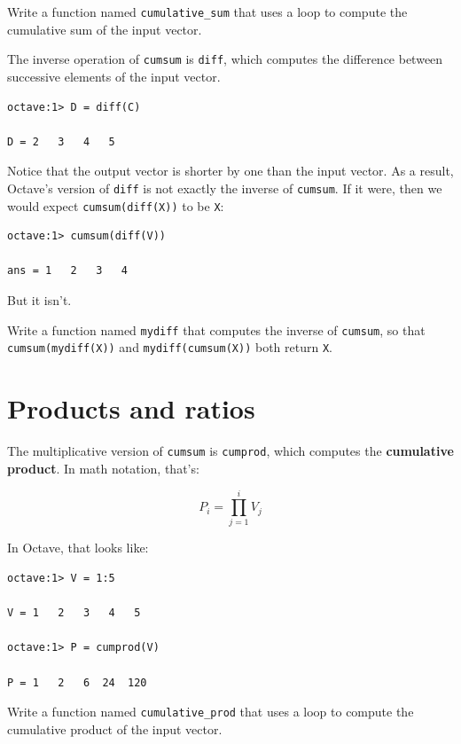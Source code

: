 \documentclass{book}
\begin{document}
\begin{ex}
Write a function named {\tt cumulative\_sum} that uses
a loop to compute the cumulative sum of the input vector.
\end{ex}

The inverse operation of {\tt cumsum} is {\tt diff}, which computes
the difference between successive elements of the input vector.

\begin{verbatim}
octave:1> D = diff(C)

D = 2   3   4   5
\end{verbatim}

Notice that the output vector is shorter by one than the input
vector. As a result, Octave's version of {\tt diff} is not
exactly the inverse of {\tt cumsum}. If it were, then we would
expect {\tt cumsum(diff(X))} to be {\tt X}:

\begin{verbatim}
octave:1> cumsum(diff(V))

ans = 1   2   3   4
\end{verbatim}

But it isn't.

\begin{ex}
Write a function named {\tt mydiff} that computes the
inverse of {\tt cumsum}, so that {\tt cumsum(mydiff(X))} and
{\tt mydiff(cumsum(X))} both
return {\tt X}.
\end{ex}


\section{Products and ratios}

The multiplicative version of {\tt cumsum} is {\tt cumprod},
which computes the {\bf cumulative product}. In math notation,
that's:

\[ P_i = \prod_{j=1}^i V_j \]

In Octave, that looks like:

\begin{verbatim}
octave:1> V = 1:5

V = 1   2   3   4   5

octave:1> P = cumprod(V)

P = 1   2   6  24  120
\end{verbatim}

\begin{ex}
Write a function named {\tt cumulative\_prod} that uses
a loop to compute the cumulative product of the input vector.
\end{ex}
\end{document}
